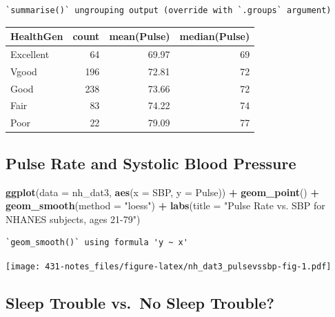 \documentclass[
]{book}
\newenvironment{Shaded}{\begin{snugshade}}{\end{snugshade}}
\newcommand{\DataTypeTok}[1]{\textcolor[rgb]{0.13,0.29,0.53}{#1}}
\newcommand{\KeywordTok}[1]{\textcolor[rgb]{0.13,0.29,0.53}{\textbf{#1}}}
\newcommand{\NormalTok}[1]{#1}
\newcommand{\OperatorTok}[1]{\textcolor[rgb]{0.81,0.36,0.00}{\textbf{#1}}}
\newcommand{\StringTok}[1]{\textcolor[rgb]{0.31,0.60,0.02}{#1}}
\begin{document}
\begin{verbatim}
`summarise()` ungrouping output (override with `.groups` argument)
\end{verbatim}

\begin{tabular}{l|r|r|r}
\hline
HealthGen & count & mean(Pulse) & median(Pulse)\\
\hline
Excellent & 64 & 69.97 & 69\\
\hline
Vgood & 196 & 72.81 & 72\\
\hline
Good & 238 & 73.66 & 72\\
\hline
Fair & 83 & 74.22 & 74\\
\hline
Poor & 22 & 79.09 & 77\\
\hline
\end{tabular}

\hypertarget{pulse-rate-and-systolic-blood-pressure}{%
\subsection{Pulse Rate and Systolic Blood Pressure}\label{pulse-rate-and-systolic-blood-pressure}}

\begin{Shaded}
\begin{Highlighting}[]
\KeywordTok{ggplot}\NormalTok{(}\DataTypeTok{data =}\NormalTok{ nh_dat3, }\KeywordTok{aes}\NormalTok{(}\DataTypeTok{x =}\NormalTok{ SBP, }\DataTypeTok{y =}\NormalTok{ Pulse)) }\OperatorTok{+}
\StringTok{    }\KeywordTok{geom_point}\NormalTok{() }\OperatorTok{+}
\StringTok{    }\KeywordTok{geom_smooth}\NormalTok{(}\DataTypeTok{method =} \StringTok{"loess"}\NormalTok{) }\OperatorTok{+}
\StringTok{    }\KeywordTok{labs}\NormalTok{(}\DataTypeTok{title =} \StringTok{"Pulse Rate vs. SBP for NHANES subjects, ages 21-79"}\NormalTok{)}
\end{Highlighting}
\end{Shaded}

\begin{verbatim}
`geom_smooth()` using formula 'y ~ x'
\end{verbatim}

\texttt{[image: 431-notes\_files/figure-latex/nh\_dat3\_pulsevssbp-fig-1.pdf]}

\hypertarget{sleep-trouble-vs.-no-sleep-trouble}{%
\subsection{Sleep Trouble vs.~No Sleep Trouble?}\label{sleep-trouble-vs.-no-sleep-trouble}}
\end{document}
